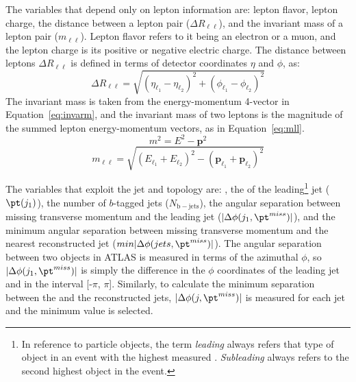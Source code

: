 The variables that depend only on lepton information are: lepton flavor, lepton charge, the distance between a lepton pair ($\Delta R_{\ell\ell}$), and the invariant mass of a lepton pair ($m_{\ell\ell}$).  Lepton flavor refers to it being an electron or a muon, and the lepton charge is its positive or negative electric charge.  The distance between leptons $\Delta R_{\ell\ell}$ is defined in terms of detector coordinates $\eta$ and $\phi$, as:
\begin{equation}
\Delta R_{\ell\ell} = \sqrt{(\eta_{\ell_1}-\eta_{\ell_2})^2+(\phi_{\ell_1}-\phi_{\ell_2})^2}
\end{equation} 
The invariant mass is taken from the energy-momentum 4-vector in Equation~\ref{eq:invarm}, and the invariant mass of two leptons is the magnitude of the summed lepton energy-momentum vectors, as in Equation~\ref{eq:mll}.
 \begin{equation}
m^2 = E^2-\mathbf{p}^2
\label{eq:invarm}
\end{equation} 
 \begin{equation}
m_{\ell\ell} = \sqrt{(E_{\ell_1}+E_{\ell_2})^2 - (\mathbf{p}_{\ell_1}+\mathbf{p}_{\ell_2})^2}
\label{eq:mll}
\end{equation} 

The variables that exploit the jet and \met topology are: \met{}, the \pt of the leading\footnote{In reference to particle objects, the term \textit{leading} always refers that type of object in an event with the highest measured \pt{}.  \textit{Subleading} always refers to the second highest \pt{} object in the event.} jet ($\pt(j_1)$), the number of $b$-tagged jets ($N_\mathrm{b-jets}$), the angular separation between missing transverse momentum and the leading jet ($|\Delta\phi(j_1, \pt^{miss})|$), and the minimum angular separation between missing transverse momentum and the nearest reconstructed jet ($min|\Delta\phi(jets, \pt^{miss})|$).  The angular separation between two objects in ATLAS is measured in terms of the azimuthal $\phi$, so $|\Delta\phi(j_1, \pt^{miss})|$ is simply the difference in the $\phi$ coordinates of the leading jet and \met{} in the interval [-$\pi$, $\pi$].  Similarly, to calculate the minimum separation between the \met and the reconstructed jets, $|\Delta\phi(j, \pt^{miss})|$ is measured for each jet and the minimum value is selected.

